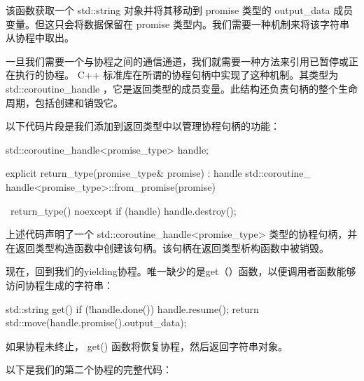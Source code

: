该函数获取一个 std::string 对象并将其移动到 promise 类型的 output\_data 成员变量。但这只会将数据保留在 promise 类型内。我们需要一种机制来将该字符串从协程中取出。


一旦我们需要一个与协程之间的通信通道，我们就需要一种方法来引用已暂停或正在执行的协程。 C++ 标准库在所谓的协程句柄中实现了这种机制。其类型为 std::coroutine\_handle ，它是返回类型的成员变量。此结构还负责句柄的整个生命周期，包括创建和销毁它。

以下代码片段是我们添加到返回类型中以管理协程句柄的功能：

\begin{cpp}
std::coroutine_handle<promise_type> handle{};

explicit return_type(promise_type& promise) : handle{ std::coroutine_
    handle<promise_type>::from_promise(promise)} {
}

~return_type() noexcept {
    if (handle) {
        handle.destroy();
    }
}
\end{cpp}

上述代码声明了一个 std::coroutine\_handle<promise\_type> 类型的协程句柄，并在返回类型构造函数中创建该句柄。该句柄在返回类型析构函数中被销毁。

现在，回到我们的yielding协程。唯一缺少的是get（）函数，以便调用者函数能够访问协程生成的字符串：

\begin{cpp}
std::string get() {
    if (!handle.done()) {
        handle.resume();
    }
    return std::move(handle.promise().output_data);
}
\end{cpp}

如果协程未终止， get() 函数将恢复协程，然后返回字符串对象。

以下是我们的第二个协程的完整代码：

